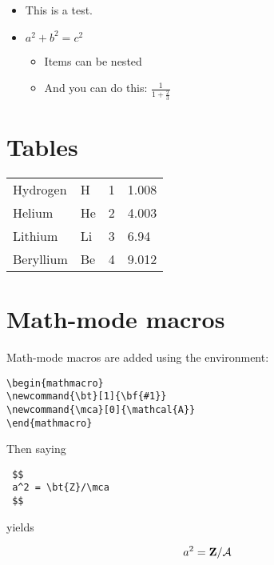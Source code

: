 \begin{itemize}

\item This is  a test.

\item {} $a^2 + b^2 = c^2$

\begin{itemize}

\item Items can be nested

\item And you can do this: $ \frac{1}{1 + \frac{2}{3}} $

\end{itemize}

\end{itemize}

\section{Tables}

\begin{indent}
\begin{tabular}{ l l l l }
Hydrogen & H & 1 & 1.008 \\
Helium & He & 2 & 4.003 \\
Lithium& Li & 3 & 6.94 \\
Beryllium& Be& 4& 9.012 \\
\end{tabular}
\end{indent}

\section{Math-mode macros}

Math-mode macros are added using the  environment:

\begin{verbatim}
\begin{mathmacro}
\newcommand{\bt}[1]{\bf{#1}}
\newcommand{\mca}[0]{\mathcal{A}}
\end{mathmacro}
\end{verbatim}

Then saying

\begin{verbatim}
 $$
 a^2 = \bt{Z}/\mca
 $$
\end{verbatim}

yields

$$
a^2 = \bt{Z}/\mca
$$

